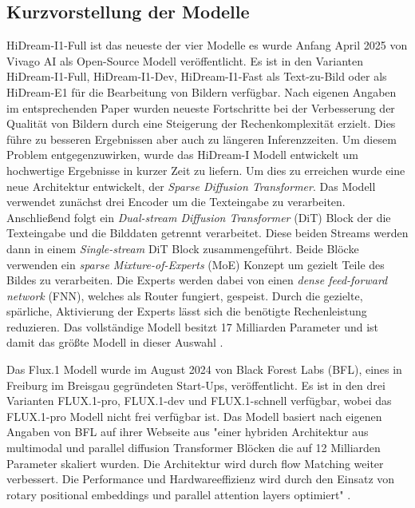 \subsection{Kurzvorstellung der Modelle}
HiDream-I1-Full ist das neueste der vier Modelle es wurde Anfang April 2025 von Vivago AI als Open-Source Modell veröffentlicht. Es ist in den Varianten HiDream-I1-Full, HiDream-I1-Dev, HiDream-I1-Fast als Text-zu-Bild oder als HiDream-E1 für die Bearbeitung von Bildern verfügbar. Nach eigenen Angaben im entsprechenden Paper \cite[Abstract]{cai2025hidreami1highefficientimagegenerative} wurden neueste Fortschritte bei der Verbesserung der Qualität von Bildern durch eine Steigerung der Rechenkomplexität erzielt. Dies führe zu besseren Ergebnissen aber auch zu längeren Inferenzzeiten. Um diesem Problem entgegenzuwirken, wurde das HiDream-I Modell entwickelt um hochwertige Ergebnisse in kurzer Zeit zu liefern.
Um dies zu erreichen wurde eine neue Architektur entwickelt, der \emph{Sparse Diffusion Transformer}. Das Modell verwendet zunächst drei Encoder um die Texteingabe zu verarbeiten. Anschließend folgt ein \emph{Dual-stream Diffusion Transformer} (DiT) Block der die Texteingabe und die Bilddaten getrennt verarbeitet. Diese beiden Streams werden dann in einem \emph{Single-stream} DiT Block zusammengeführt. 
Beide Blöcke verwenden ein \emph{sparse Mixture-of-Experts} (MoE) Konzept um gezielt Teile des Bildes zu verarbeiten. Die Experts werden dabei von einen \emph{dense feed-forward network} (FNN), welches als Router fungiert, gespeist. Durch die gezielte, spärliche, Aktivierung der Experts lässt sich die benötigte Rechenleistung reduzieren.
Das vollständige Modell besitzt 17 Milliarden Parameter und ist damit das größte Modell in dieser Auswahl \cite[S.~7-9]{cai2025hidreami1highefficientimagegenerative}.

Das Flux.1 Modell wurde im August 2024 von Black Forest Labs (BFL), eines in Freiburg im Breisgau gegründeten Start-Ups, veröffentlicht. Es ist in den drei Varianten FLUX.1-pro, FLUX.1-dev und FLUX.1-schnell verfügbar, wobei das FLUX.1-pro Modell nicht frei verfügbar ist. 
Das Modell basiert nach eigenen Angaben von BFL auf ihrer Webseite aus "einer hybriden Architektur aus multimodal und parallel diffusion Transformer Blöcken die auf 12 Milliarden Parameter skaliert wurden. Die Architektur wird durch flow Matching weiter verbessert. Die Performance und Hardwareeffizienz wird durch den Einsatz von rotary positional embeddings und parallel attention layers optimiert" \cite{bfl-flux-announcement}.

